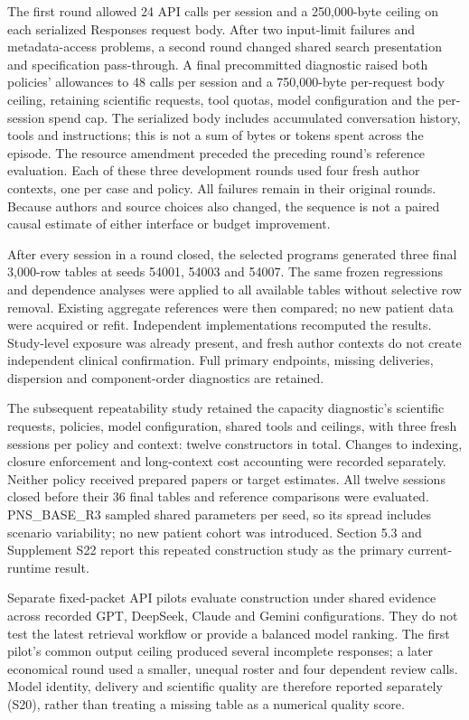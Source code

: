 \documentclass[11pt,letterpaper]{article}
\begin{document}
The first round allowed 24 API calls per session and a 250,000-byte ceiling on each serialized Responses request body. After two input-limit failures and metadata-access problems, a second round changed shared search presentation and specification pass-through. A final precommitted diagnostic raised both policies' allowances to 48 calls per session and a 750,000-byte per-request body ceiling, retaining scientific requests, tool quotas, model configuration and the per-session spend cap. The serialized body includes accumulated conversation history, tools and instructions; this is not a sum of bytes or tokens spent across the episode. The resource amendment preceded the preceding round's reference evaluation. Each of these three development rounds used four fresh author contexts, one per case and policy. All failures remain in their original rounds. Because authors and source choices also changed, the sequence is not a paired causal estimate of either interface or budget improvement.


After every session in a round closed, the selected programs generated three final 3,000-row tables at seeds 54001, 54003 and 54007. The same frozen regressions and dependence analyses were applied to all available tables without selective row removal. Existing aggregate references were then compared; no new patient data were acquired or refit. Independent implementations recomputed the results. Study-level exposure was already present, and fresh author contexts do not create independent clinical confirmation. Full primary endpoints, missing deliveries, dispersion and component-order diagnostics are retained.


The subsequent repeatability study retained the capacity diagnostic's scientific requests, policies, model configuration, shared tools and ceilings, with three fresh sessions per policy and context: twelve constructors in total. Changes to indexing, closure enforcement and long-context cost accounting were recorded separately. Neither policy received prepared papers or target estimates. All twelve sessions closed before their 36 final tables and reference comparisons were evaluated. PNS\_BASE\_R3 sampled shared parameters per seed, so its spread includes scenario variability; no new patient cohort was introduced. Section 5.3 and Supplement S22 report this repeated construction study as the primary current-runtime result.


Separate fixed-packet API pilots evaluate construction under shared evidence across recorded GPT, DeepSeek, Claude and Gemini configurations. They do not test the latest retrieval workflow or provide a balanced model ranking. The first pilot's common output ceiling produced several incomplete responses; a later economical round used a smaller, unequal roster and four dependent review calls. Model identity, delivery and scientific quality are therefore reported separately (S20), rather than treating a missing table as a numerical quality score.
\end{document}
